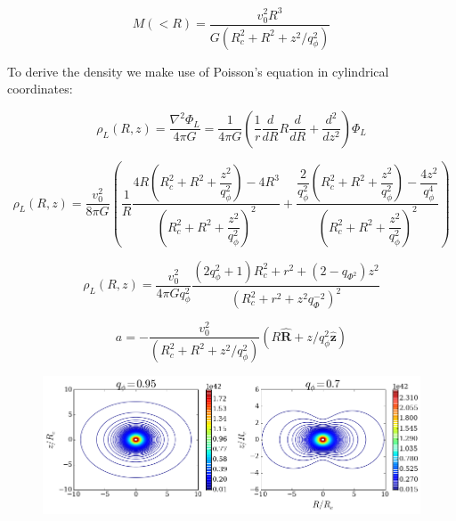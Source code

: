 \begin{equation}
M(<R) = \dfrac{v_0^2 R^3}{G (R_c^2 + R^2 + z^2/q_{\phi}^2)} 
\end{equation}


To derive the density we make use of Poisson's equation in cylindrical coordinates:

\begin{equation}
\rho_L(R, z) = \dfrac{\nabla^2 \Phi_L}{4 \pi G } = \dfrac{1}{4 \pi G} \left( \dfrac{1}{r}\dfrac{d}{dR}R\dfrac{d}{dR}  + \dfrac{d^2}{dz^2}  \right) \Phi_L
\end{equation}

\begin{equation}
\rho_L(R, z) = \dfrac{v_0^2}{8 \pi G } \left( \dfrac{1}{R} \dfrac{4R ( R_c^2 + R^2 + \dfrac{z^2}{q_{\phi}^2} ) - 4R^3}{( R_c^2 + R^2 + \dfrac{z^2}{q_{\phi}^2} )^2} + \dfrac{\dfrac{2}{q_{\phi}^2} ( R_c^2 + R^2 + \dfrac{z^2}{q_{\phi}^2} ) - \dfrac{4z^2}{q_{\phi}^4}}{( R_c^2 + R^2 + \dfrac{z^2}{q_{\phi}^2} )^2}  \right)
\end{equation}

\begin{equation}
\rho_L(R, z) =  \dfrac{v_0^2}{4 \pi G q_{\phi}^2} \dfrac{(2q_{\phi}^2 + 1)R_c^2 + r^2 + (2 - q_{\Phi^2})z^2}{(R_c^2 + r^2 + z^2q_{\Phi}^{-2})^2}
\end{equation}


\begin{equation}
a =  - \dfrac{v_0^2}{(R_c^2 + R^2 + z^2/q_{\phi}^2)} (R \mathbf{\hat{R}} + z/q_{\phi}^2 \mathbf{\hat{z}}) 
\end{equation}

\begin{figure}[H]
\centering
\includegraphics[scale=0.6]{../figures/MN_logarithmic_contours.png}
\end{figure}

